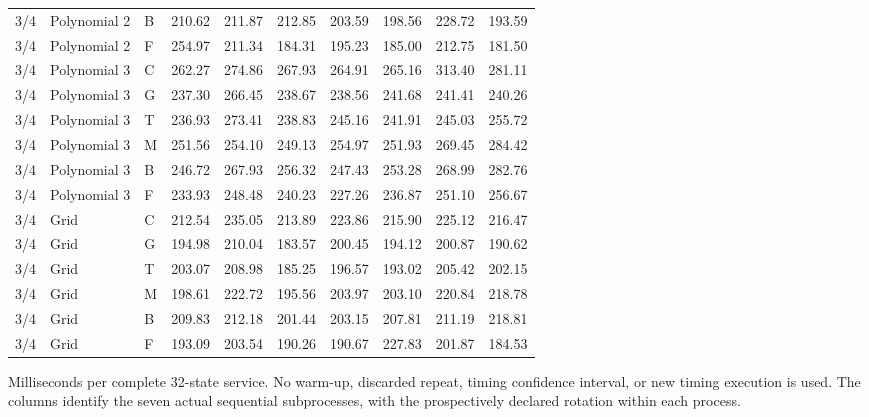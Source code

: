 \begin{longtable}{lllrrrrrrr}
3/4 & Polynomial 2 & B & 210.62 & 211.87 & 212.85 & 203.59 & 198.56 & 228.72 & 193.59 \\
3/4 & Polynomial 2 & F & 254.97 & 211.34 & 184.31 & 195.23 & 185.00 & 212.75 & 181.50 \\
3/4 & Polynomial 3 & C & 262.27 & 274.86 & 267.93 & 264.91 & 265.16 & 313.40 & 281.11 \\
3/4 & Polynomial 3 & G & 237.30 & 266.45 & 238.67 & 238.56 & 241.68 & 241.41 & 240.26 \\
3/4 & Polynomial 3 & T & 236.93 & 273.41 & 238.83 & 245.16 & 241.91 & 245.03 & 255.72 \\
3/4 & Polynomial 3 & M & 251.56 & 254.10 & 249.13 & 254.97 & 251.93 & 269.45 & 284.42 \\
3/4 & Polynomial 3 & B & 246.72 & 267.93 & 256.32 & 247.43 & 253.28 & 268.99 & 282.76 \\
3/4 & Polynomial 3 & F & 233.93 & 248.48 & 240.23 & 227.26 & 236.87 & 251.10 & 256.67 \\
3/4 & Grid & C & 212.54 & 235.05 & 213.89 & 223.86 & 215.90 & 225.12 & 216.47 \\
3/4 & Grid & G & 194.98 & 210.04 & 183.57 & 200.45 & 194.12 & 200.87 & 190.62 \\
3/4 & Grid & T & 203.07 & 208.98 & 185.25 & 196.57 & 193.02 & 205.42 & 202.15 \\
3/4 & Grid & M & 198.61 & 222.72 & 195.56 & 203.97 & 203.10 & 220.84 & 218.78 \\
3/4 & Grid & B & 209.83 & 212.18 & 201.44 & 203.15 & 207.81 & 211.19 & 218.81 \\
3/4 & Grid & F & 193.09 & 203.54 & 190.26 & 190.67 & 227.83 & 201.87 & 184.53 \\
\end{longtable}
\noindent Milliseconds per complete 32-state service. No warm-up, discarded repeat, timing confidence interval, or new timing execution is used. The columns identify the seven actual sequential subprocesses, with the prospectively declared rotation within each process.
\endgroup
